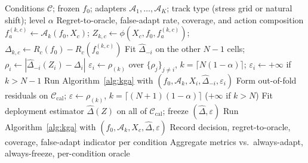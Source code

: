 \begin{algorithm}[t]
\caption{Calibration and evaluation for K-Bound (grid vs.\ natural-shift branches)}
\label{alg:calib-eval}
\begin{algorithmic}[1]
\Require Conditions $\mathcal{C}$; frozen $f_0$; adapters $\mathcal{A}_1,\ldots,\mathcal{A}_K$;
  track type (stress grid or natural shift); level $\alpha$
\Ensure Regret-to-oracle, false-adapt rate, coverage, and action composition
 
    \State $f_a^{(k,c)} \leftarrow \mathcal{A}_k(f_0, X_c)$;\;
      $Z_{k,c} \leftarrow \phi(X_c, f_0, f_a^{(k,c)})$;\;
      $\Delta_{k,c} \leftarrow R_c(f_0) - R_c(f_a^{(k,c)})$
\EndFor
{}
    \State Fit $\widehat\Delta_{-i}$ on the other $N{-}1$ cells;\;
      $\rho_i \leftarrow |\widehat\Delta_{-i}(Z_i)-\Delta_i|$ 
  \EndFor
    \State $\varepsilon_i \leftarrow \rho_{(k)}$ over $\{\rho_j\}_{j\ne i}$, $k=\lceil N(1-\alpha)\rceil$;\;
      $\varepsilon_i \leftarrow +\infty$ if $k>N{-}1$
  \EndFor
    \State Run Algorithm~\ref{alg:kga} with $(f_0,\mathcal{A}_k,X_i,\widehat\Delta_{-i},\varepsilon_i)$
  \EndFor
{}
  \State Form out-of-fold residuals on $\mathcal{C}_{\mathrm{cal}}$;\;
    $\varepsilon \leftarrow \rho_{(k)}$, $k=\lceil (N{+}1)(1-\alpha)\rceil$ ($+\infty$ if $k>N$)
  \State Fit deployment estimator $\widehat\Delta(Z)$ on all of $\mathcal{C}_{\mathrm{cal}}$;\;
    freeze $(\widehat\Delta,\varepsilon)$
    \State Run Algorithm~\ref{alg:kga} with $(f_0,\mathcal{A}_k,X_c,\widehat\Delta,\varepsilon)$
  \EndFor
\EndIf
\State Record decision, regret-to-oracle, coverage, false-adapt indicator per condition
\State Aggregate metrics vs.\ always-adapt, always-freeze, per-condition oracle
\end{algorithmic}
\end{algorithm}


